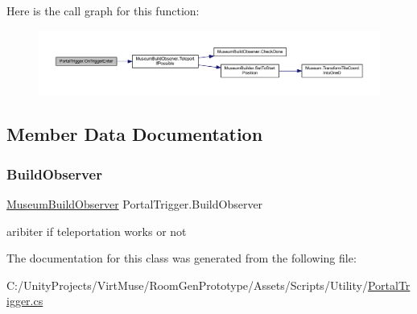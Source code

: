 Here is the call graph for this function\+:
\nopagebreak
\begin{figure}[H]
\begin{center}
\leavevmode
\includegraphics[width=350pt]{class_portal_trigger_ae73070bf23c6348ced79aa839e0e2ad7_cgraph}
\end{center}
\end{figure}


\subsection{Member Data Documentation}
\mbox{\label{class_portal_trigger_a26ee63b0f443863cd4bc7a2626063f5b}} 
\subsubsection{\texorpdfstring{Build\+Observer}{BuildObserver}}
{\footnotesize\ttfamily \mbox{\hyperlink{class_museum_build_observer}{Museum\+Build\+Observer}} Portal\+Trigger.\+Build\+Observer\hspace{0.3cm}{\ttfamily [private]}}



aribiter if teleportation works or not 



The documentation for this class was generated from the following file\+:\begin{DoxyCompactItemize}
\item 
C\+:/\+Unity\+Projects/\+Virt\+Muse/\+Room\+Gen\+Prototype/\+Assets/\+Scripts/\+Utility/\mbox{\hyperlink{_portal_trigger_8cs}{Portal\+Trigger.\+cs}}\end{DoxyCompactItemize}
